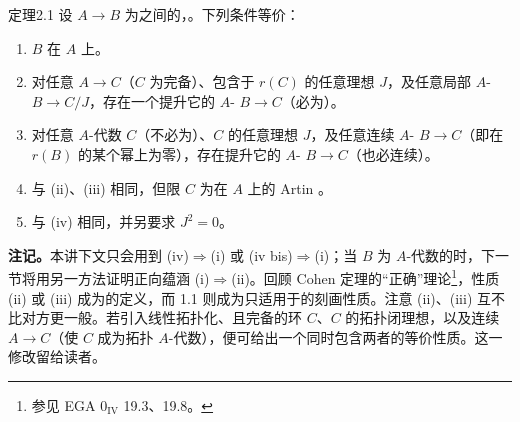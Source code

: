 \begin{SGAresult}{定理}{2.1}
设 $A\to B$ 为之间的，。下列条件等价：
\begin{enumerate}
\item[(i)] $B$ 在 $A$ 上。
\item[(ii)] 对任意 $A\to C$（$C$ 为完备）、包含于 $r(C)$ 的任意理想 $J$，及任意局部 $A$- $B\to C/J$，存在一个提升它的 $A$- $B\to C$（必为）。
\item[(iii)] 对任意 $A$-代数 $C$（不必为）、$C$ 的任意理想 $J$，及任意连续 $A$- $B\to C$（即在 $r(B)$ 的某个幂上为零），存在提升它的 $A$- $B\to C$（也必连续）。
\item[(iv)] 与 (ii)、(iii) 相同，但限 $C$ 为在 $A$ 上的 Artin 。
\item[(iv bis)] 与 (iv) 相同，并另要求 $J^2=0$。
\end{enumerate}
\end{SGAresult}
\textbf{注记。}本讲下文只会用到 (iv)$\Rightarrow$(i) 或 (iv bis)$\Rightarrow$(i)；当 $B$ 为 $A$-代数的时，下一节将用另一方法证明正向蕴涵 (i)$\Rightarrow$(ii)。回顾 Cohen 定理的“正确”理论\footnote{参见 EGA $0_{\mathrm{IV}}$ 19.3、19.8。}，性质 (ii) 或 (iii) 成为的定义，而 1.1 则成为只适用于的刻画性质。注意 (ii)、(iii) 互不比对方更一般。若引入线性拓扑化、且完备的环 $C$、$C$ 的拓扑闭理想，以及连续 $A\to C$（使 $C$ 成为拓扑 $A$-代数），便可给出一个同时包含两者的等价性质。这一修改留给读者。

